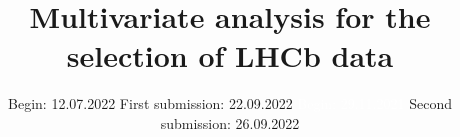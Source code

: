 


\title{Multivariate analysis for the selection of LHCb data}
\date{%
  Begin: 12.07.2022
  \hspace{3em}
  First submission:  22.09.2022
  \textcolor{white}{Begin: 29.11.2021} \hspace{3em} Second submission: 26.09.2022
}



\maketitle
\thispagestyle{empty}
\tableofcontents
\newpage






\printbibliography{}


